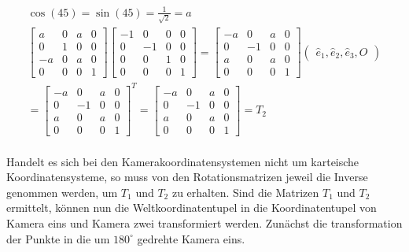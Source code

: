 \begin{gather}
	\cos(45)=\sin(45)=\frac{1}{\sqrt{2}} = a\\
	\begin{bmatrix}
		a&0&a&0\\
		0&1&0&0\\
		-a&0&a&0\\
		0&0&0&1
	\end{bmatrix}
	\begin{bmatrix}
		-1&0&0&0\\
		0&-1&0&0\\
		0&0&1&0\\
		0&0&0&1
	\end{bmatrix}
	=\begin{bmatrix}
		-a&0&a&0\\
		0&-1&0&0\\
		a&0&a&0\\
		0&0&0&1
	\end{bmatrix}
	\begin{pmatrix}
		\hat{e}_1,\hat{e}_2,\hat{e}_3,O
	\end{pmatrix}\\
	=\begin{bmatrix}
	-a&0&a&0\\
	0&-1&0&0\\
	a&0&a&0\\
	0&0&0&1
	\end{bmatrix}^T
	=
	\begin{bmatrix}
		-a&0&a&0\\
		0&-1&0&0\\
		a&0&a&0\\
		0&0&0&1
	\end{bmatrix}
	= T_2
\end{gather}\\

Handelt es sich bei den Kamerakoordinatensystemen nicht um karteische Koordinatensysteme, so muss von den Rotationsmatrizen jeweil die Inverse genommen werden, um \ensuremath{T_1} und \ensuremath{T_2} zu erhalten. Sind die Matrizen \ensuremath{T_1} und \ensuremath{T_2} ermittelt, können nun die Weltkoordinatentupel in die Koordinatentupel von Kamera eins und Kamera zwei transformiert werden. Zunächst die transformation der Punkte in die um \ensuremath{180^\circ} gedrehte Kamera eins.

